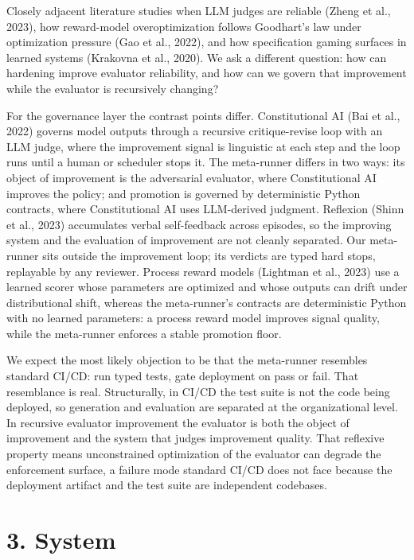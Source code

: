 \documentclass[
  11pt]{article}
\begin{document}
Closely adjacent literature studies when LLM judges are reliable (Zheng
et al., 2023), how reward-model overoptimization follows Goodhart's law
under optimization pressure (Gao et al., 2022), and how specification
gaming surfaces in learned systems (Krakovna et al., 2020). We ask a
different question: how can hardening improve evaluator reliability, and
how can we govern that improvement while the evaluator is recursively
changing?

For the governance layer the contrast points differ. Constitutional AI
(Bai et al., 2022) governs model outputs through a recursive
critique-revise loop with an LLM judge, where the improvement signal is
linguistic at each step and the loop runs until a human or scheduler
stops it. The meta-runner differs in two ways: its object of improvement
is the adversarial evaluator, where Constitutional AI improves the
policy; and promotion is governed by deterministic Python contracts,
where Constitutional AI uses LLM-derived judgment. Reflexion (Shinn et
al., 2023) accumulates verbal self-feedback across episodes, so the
improving system and the evaluation of improvement are not cleanly
separated. Our meta-runner sits outside the improvement loop; its
verdicts are typed hard stops, replayable by any reviewer. Process
reward models (Lightman et al., 2023) use a learned scorer whose
parameters are optimized and whose outputs can drift under
distributional shift, whereas the meta-runner's contracts are
deterministic Python with no learned parameters: a process reward model
improves signal quality, while the meta-runner enforces a stable
promotion floor.

We expect the most likely objection to be that the meta-runner resembles
standard CI/CD: run typed tests, gate deployment on pass or fail. That
resemblance is real. Structurally, in CI/CD the test suite is not the
code being deployed, so generation and evaluation are separated at the
organizational level. In recursive evaluator improvement the evaluator
is both the object of improvement and the system that judges improvement
quality. That reflexive property means unconstrained optimization of the
evaluator can degrade the enforcement surface, a failure mode standard
CI/CD does not face because the deployment artifact and the test suite
are independent codebases.

\section{3. System}\label{system}
\end{document}

